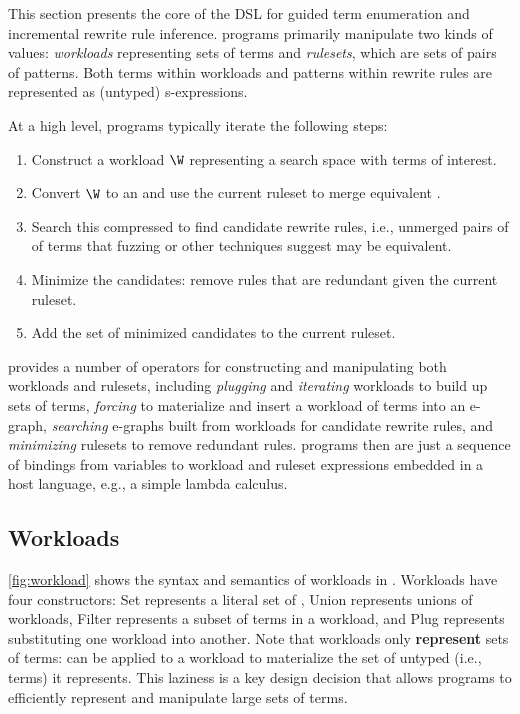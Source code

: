 This section presents the core of
  the \enumo DSL for
  guided term enumeration and
  incremental rewrite rule inference.
\enumo programs primarily manipulate two kinds of values:
  \textit{workloads} representing sets of terms and
  \textit{rulesets}, which are sets of pairs of patterns.
Both terms within workloads and
  patterns within rewrite rules are
  represented as (untyped) s-expressions.

At a high level, \enumo programs
  typically iterate the following steps:
\begin{enumerate}
  \item Construct a workload $\W$
    representing a search space
    with terms of interest.
  \item Convert $\W$ to an \egraph and
    use the current ruleset to
    merge equivalent \eclasses.
  \item Search this compressed \egraph
    to find candidate rewrite rules,
    i.e., unmerged pairs of \eclasses of terms
    that fuzzing or other techniques suggest
    may be equivalent.
  \item Minimize the candidates:
    remove rules that are redundant
    given the current ruleset.
  \item Add the set of minimized candidates to
    the current ruleset.
\end{enumerate}

\enumo provides a number of operators for
  constructing and manipulating both
  workloads and rulesets, including
  \textit{plugging} and \textit{iterating} workloads
    to build up sets of terms,
  \textit{forcing} to materialize and insert a
    workload of terms into an e-graph,
  \textit{searching} e-graphs built from workloads for
    candidate rewrite rules, and
  \textit{minimizing} rulesets to
    remove redundant rules.
\enumo programs then are just a sequence of bindings
 from variables to workload and ruleset expressions
 embedded in a host language,
 e.g., a simple lambda calculus.

\subsection{Workloads}
\label{subsec:workloads}

\autoref{fig:workload} shows the syntax and semantics of
  workloads in \enumo.
Workloads have four constructors:
  \textsf{Set} represents a literal set of \sexps,
  \textsf{Union} represents unions of workloads,
  \textsf{Filter} represents a subset of terms in a workload, and
  \textsf{Plug} represents substituting
    one workload into another.
Note that workloads only \textbf{represent} sets of terms:
   can be applied to a workload to
  materialize the set of
  untyped \sexps (i.e., terms)
  it represents.
This laziness is a key design decision
  that allows \enumo programs to efficiently
  represent and manipulate large sets of terms.

